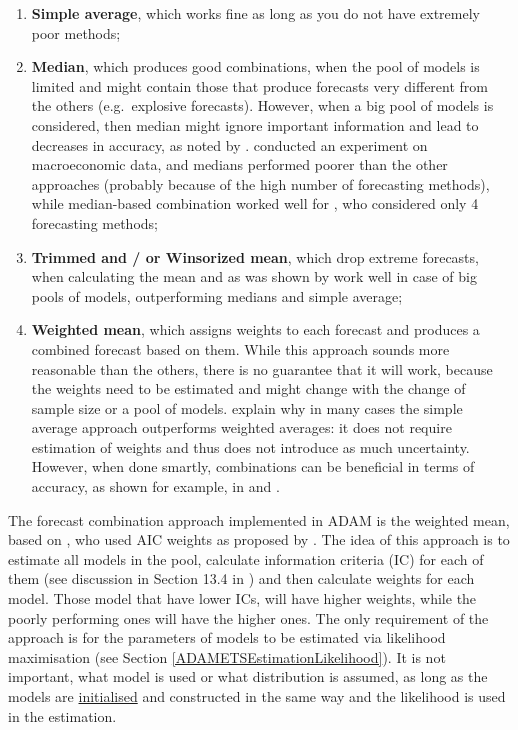 \documentclass[
]{book}
\providecommand{\tightlist}{%
  \setlength{\itemsep}{0pt}\setlength{\parskip}{0pt}}
\theoremstyle{definition}
\theoremstyle{definition}
\theoremstyle{definition}
\theoremstyle{definition}
\theoremstyle{remark}
\begin{document}
\begin{enumerate}
\def\labelenumi{\arabic{enumi}.}
\tightlist
\item
  \textbf{Simple average}, which works fine as long as you do not have extremely poor methods;
\item
  \textbf{Median}, which produces good combinations, when the pool of models is limited and might contain those that produce forecasts very different from the others (e.g.~explosive forecasts). However, when a big pool of models is considered, then median might ignore important information and lead to decreases in accuracy, as noted by \citet{Jose2008}. \citet{Stock2004} conducted an experiment on macroeconomic data, and medians performed poorer than the other approaches (probably because of the high number of forecasting methods), while median-based combination worked well for \citet{Petropoulos2020}, who considered only 4 forecasting methods;
\item
  \textbf{Trimmed and / or Winsorized mean}, which drop extreme forecasts, when calculating the mean and as was shown by \citet{Jose2008} work well in case of big pools of models, outperforming medians and simple average;
\item
  \textbf{Weighted mean}, which assigns weights to each forecast and produces a combined forecast based on them. While this approach sounds more reasonable than the others, there is no guarantee that it will work, because the weights need to be estimated and might change with the change of sample size or a pool of models. \citet{Claeskens2016} explain why in many cases the simple average approach outperforms weighted averages: it does not require estimation of weights and thus does not introduce as much uncertainty. However, when done smartly, combinations can be beneficial in terms of accuracy, as shown for example, in \citet{Kolassa2011} and \citet{Kourentzes2019c}.
\end{enumerate}

The forecast combination approach implemented in ADAM is the weighted mean, based on \citet{Kolassa2011}, who used AIC weights as proposed by \citet{Burnham2004}. The idea of this approach is to estimate all models in the pool, calculate information criteria (IC) for each of them (see discussion in Section 13.4 in \citet{SvetunkovSBA}) and then calculate weights for each model. Those model that have lower ICs, will have higher weights, while the poorly performing ones will have the higher ones. The only requirement of the approach is for the parameters of models to be estimated via likelihood maximisation (see Section \ref{ADAMETSEstimationLikelihood}). It is not important, what model is used or what distribution is assumed, as long as the models are \protect\hyperlink{ADAMInitialisation}{initialised} and constructed in the same way and the likelihood is used in the estimation.
\end{document}
